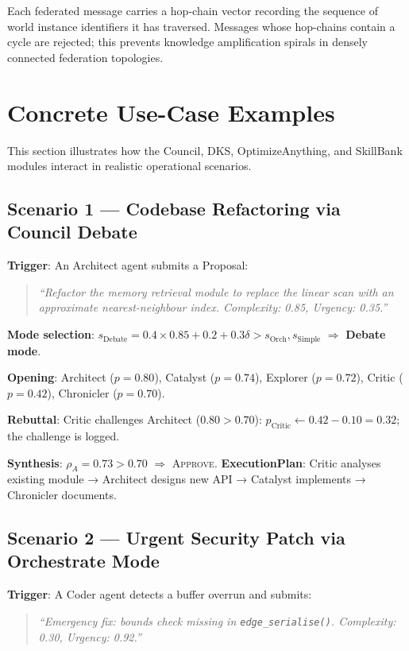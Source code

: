 \documentclass[11pt]{article}
\begin{document}
Each federated message carries a hop-chain vector recording the sequence of
world instance identifiers it has traversed. Messages whose hop-chains contain
a cycle are rejected; this prevents knowledge amplification spirals in densely
connected federation topologies.

\section{Concrete Use-Case Examples}
\label{sec:usecases}

This section illustrates how the Council, DKS, OptimizeAnything, and SkillBank
modules interact in realistic operational scenarios.

\subsection{Scenario 1 — Codebase Refactoring via Council Debate}

\noindent\textbf{Trigger}: An Architect agent submits a Proposal:
\begin{quote}
\small\itshape
``Refactor the memory retrieval module to replace the linear scan with an
approximate nearest-neighbour index. Complexity: 0.85, Urgency: 0.35.''
\end{quote}

\noindent\textbf{Mode selection}: $s_{\text{Debate}} = 0.4 \times 0.85 + 0.2 +
0.3\delta > s_{\text{Orch}}, s_{\text{Simple}}$ $\Rightarrow$ \textbf{Debate mode}.

\noindent\textbf{Opening}: Architect ($p=0.80$), Catalyst ($p=0.74$), Explorer
($p=0.72$), Critic ($p=0.42$), Chronicler ($p=0.70$).

\noindent\textbf{Rebuttal}: Critic challenges Architect ($0.80 > 0.70$):
$p_{\text{Critic}} \leftarrow 0.42 - 0.10 = 0.32$; the challenge is logged.

\noindent\textbf{Synthesis}: $\rho_A = 0.73 > 0.70$ $\Rightarrow$
\textsc{Approve}. \textbf{ExecutionPlan}: Critic analyses existing module →
Architect designs new API → Catalyst implements → Chronicler documents.

\subsection{Scenario 2 — Urgent Security Patch via Orchestrate Mode}

\noindent\textbf{Trigger}: A Coder agent detects a buffer overrun and submits:
\begin{quote}
\small\itshape
``Emergency fix: bounds check missing in \texttt{edge\_serialise()}. Complexity:
0.30, Urgency: 0.92.''
\end{quote}
\end{document}

